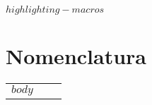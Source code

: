 $highlighting-macros$
\chapter*{Nomenclatura} %
\linespread{1.3}

\begin{longtable}{p{5mm} c p{120mm} }
	$body$
\end{longtable}
\clearpage